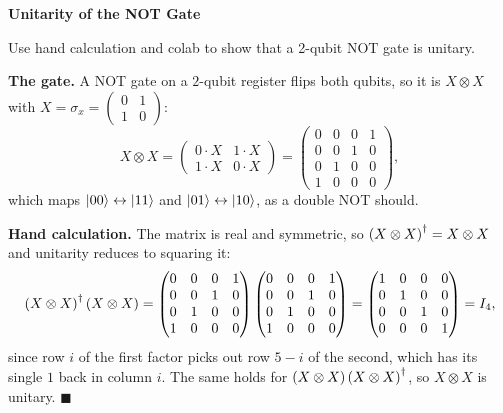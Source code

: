 \documentclass[a4paper, 10pt]{article}
\begin{document}
\newpage

\begin{problem}
\textbf{Unitarity of the NOT Gate}
\par Use hand calculation and colab to show that a 2-qubit NOT gate is unitary.
\end{problem}

\begin{solution}
	\noindent \textbf{The gate.} A NOT gate on a \( 2 \)-qubit register flips both qubits, so it is \( X \otimes X \) with \( X = \sigma_x = \begin{pmatrix} 0 & 1 \\ 1 & 0 \end{pmatrix} \):
	\[
		X \otimes X
		= \begin{pmatrix} 0 \cdot X & 1 \cdot X \\ 1 \cdot X & 0 \cdot X \end{pmatrix}
		= \begin{pmatrix}
			0 & 0 & 0 & 1 \\
			0 & 0 & 1 & 0 \\
			0 & 1 & 0 & 0 \\
			1 & 0 & 0 & 0
		\end{pmatrix},
	\]
	which maps \( \ket{00} \leftrightarrow \ket{11} \) and \( \ket{01} \leftrightarrow \ket{10} \), as a double NOT should.

	\noindent \textbf{Hand calculation.} The matrix is real and symmetric, so \( \left(X \otimes X\right)^{\dagger} = X \otimes X \) and unitarity reduces to squaring it:
	\[
		\left(X \otimes X\right)^{\dagger}\left(X \otimes X\right)
		= \begin{pmatrix}
			0 & 0 & 0 & 1 \\ 0 & 0 & 1 & 0 \\ 0 & 1 & 0 & 0 \\ 1 & 0 & 0 & 0
		\end{pmatrix}
		\begin{pmatrix}
			0 & 0 & 0 & 1 \\ 0 & 0 & 1 & 0 \\ 0 & 1 & 0 & 0 \\ 1 & 0 & 0 & 0
		\end{pmatrix}
		= \begin{pmatrix}
			1 & 0 & 0 & 0 \\ 0 & 1 & 0 & 0 \\ 0 & 0 & 1 & 0 \\ 0 & 0 & 0 & 1
		\end{pmatrix}
		= I_4 ,
	\]
	since row \( i \) of the first factor picks out row \( 5-i \) of the second, which has its single \( 1 \) back in column \( i \).
	The same holds for \( \left(X \otimes X\right)\left(X \otimes X\right)^{\dagger} \), so \( X \otimes X \) is unitary. \( \blacksquare \)


\end{solution}
\end{document}

